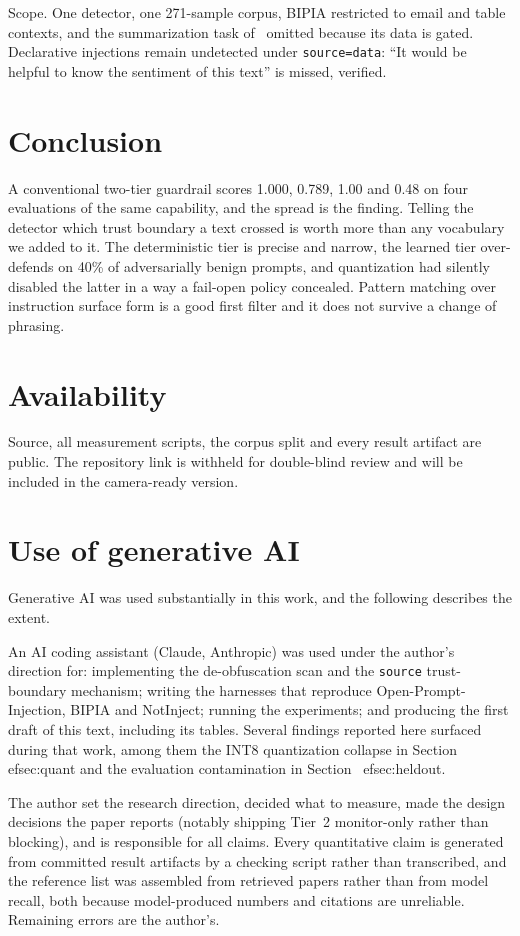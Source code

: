 \documentclass[sigconf,anonymous,review]{acmart}
\begin{document}
Scope. One detector, one 271-sample corpus, BIPIA restricted to email and table
contexts, and the summarization task of~\cite{liu2024formalizing} omitted because
its data is gated. Declarative injections remain undetected under
\texttt{source=data}: ``It would be helpful to know the sentiment of this text''
is missed, verified.

\section{Conclusion}

A conventional two-tier guardrail scores 1.000, 0.789, 1.00 and 0.48 on four
evaluations of the same capability, and the spread is the finding. Telling the
detector which trust boundary a text crossed is worth more than any vocabulary we
added to it. The deterministic tier is precise and narrow, the learned tier
over-defends on 40\% of adversarially benign prompts, and quantization had
silently disabled the latter in a way a fail-open policy concealed. Pattern
matching over instruction surface form is a good first filter and it does not
survive a change of phrasing.

\section*{Availability}

Source, all measurement scripts, the corpus split and every result artifact are
public. The repository link is withheld for double-blind review and will be
included in the camera-ready version.

\section*{Use of generative AI}

Generative AI was used substantially in this work, and the following describes
the extent.

An AI coding assistant (Claude, Anthropic) was used under the author's direction
for: implementing the de-obfuscation scan and the \texttt{source} trust-boundary
mechanism; writing the harnesses that reproduce Open-Prompt-Injection, BIPIA and
NotInject; running the experiments; and producing the first draft of this text,
including its tables. Several findings reported here surfaced during that work,
among them the INT8 quantization collapse in Section~
ef{sec:quant} and the
evaluation contamination in Section~
ef{sec:heldout}.

The author set the research direction, decided what to measure, made the design
decisions the paper reports (notably shipping Tier~2 monitor-only rather than
blocking), and is responsible for all claims. Every quantitative claim is
generated from committed result artifacts by a checking script rather than
transcribed, and the reference list was assembled from retrieved papers rather
than from model recall, both because model-produced numbers and citations are
unreliable. Remaining errors are the author's.

\balance


\end{document}
